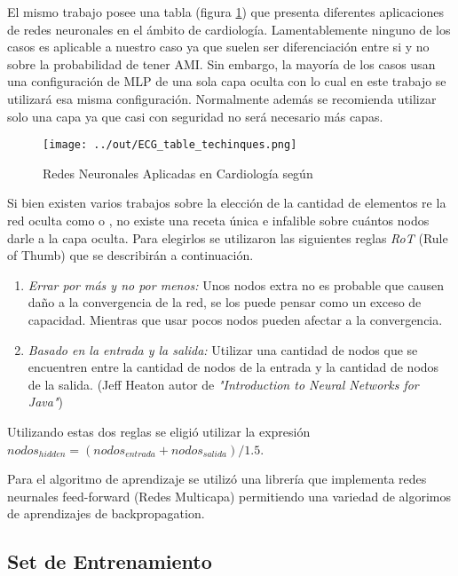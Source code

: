 \documentclass[conference]{IEEEtran}
\theoremstyle{definition}
\begin{document}
El mismo trabajo posee una tabla (figura \ref{tab_tabla_comparacion_tecnicas}) que presenta diferentes aplicaciones de redes neuronales en el \'{a}mbito de cardiolog\'{i}a. Lamentablemente ninguno de los casos es aplicable a nuestro caso ya que suelen ser diferenciaci\'{o}n entre si y no sobre la probabilidad de tener AMI. Sin embargo, la mayor\'{i}a de los casos usan una configuraci\'{o}n de MLP de una sola capa oculta con lo cual en este trabajo se utilizar\'{a} esa misma configuraci\'{o}n.
Normalmente adem\'{a}s se recomienda utilizar solo una capa ya que casi con seguridad no ser\'{a} necesario m\'{a}s capas.

\begin{figure}[H]
	\centering
	\texttt{[image: ../out/ECG\_table\_techinques.png]}
	\caption{Redes Neuronales Aplicadas en Cardiolog\'{i}a seg\'{u}n \cite{NN_HEALTHCARE}}
	\label{tab_tabla_comparacion_tecnicas}
\end{figure}

Si bien existen varios trabajos sobre la elecci\'{o}n de la cantidad de elementos re la red oculta como \cite{SIZE1} o \cite{SIZE2}, no existe una receta \'{u}nica e infalible sobre cu\'{a}ntos nodos darle a la capa oculta. Para elegirlos se utilizaron las siguientes reglas \textit{RoT} (Rule of Thumb) que se describir\'{a}n a continuaci\'{o}n.

\begin{enumerate}
	\item \textit{Errar por m\'{a}s y no por menos:} Unos nodos extra no es probable que causen da\~{n}o a la convergencia de la red, se los puede pensar como un exceso de capacidad. Mientras que usar pocos nodos pueden afectar a la convergencia. 
	\item \textit{Basado en la entrada y la salida:} Utilizar una cantidad de nodos que se encuentren entre la cantidad de nodos de la entrada y la cantidad de nodos de la salida. (Jeff Heaton autor de \textit{"Introduction to Neural Networks for Java"})
\end{enumerate}

Utilizando estas dos reglas se eligi\'{o} utilizar la expresi\'{o}n \( nodos_{hidden} = (nodos_{entrada} + nodos_{salida})/1.5\).

Para el algoritmo de aprendizaje se utiliz\'{o} una librer\'{i}a \cite{NIMBLENET} que implementa redes neurnales feed-forward (Redes Multicapa) permitiendo una variedad de algorimos de aprendizajes de backpropagation.

\subsection{Set de Entrenamiento}
\end{document}
